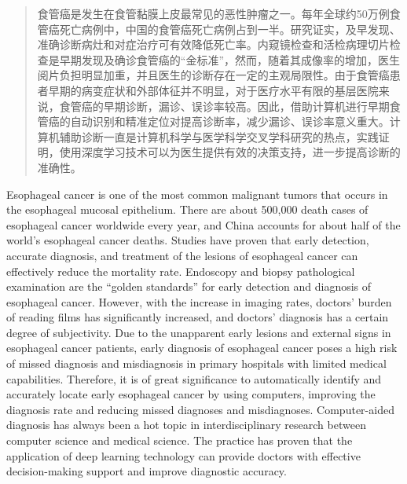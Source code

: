 
\setlength{\headheight}{13.70119pt}
\begin{abstract}
食管癌是发生在食管黏膜上皮最常见的恶性肿瘤之一。每年全球约50万例食管癌死亡病例中，中国的食管癌死亡病例占到一半。研究证实，及早发现、准确诊断病灶和对症治疗可有效降低死亡率。内窥镜检查和活检病理切片检查是早期发现及确诊食管癌的“金标准”，然而，随着其成像率的增加，医生阅片负担明显加重，并且医生的诊断存在一定的主观局限性。由于食管癌患者早期的病变症状和外部体征并不明显，对于医疗水平有限的基层医院来说，食管癌的早期诊断，漏诊、误诊率较高。因此，借助计算机进行早期食管癌的自动识别和精准定位对提高诊断率，减少漏诊、误诊率意义重大。计算机辅助诊断一直是计算机科学与医学科学交叉学科研究的热点，实践证明，使用深度学习技术可以为医生提供有效的决策支持，进一步提高诊断的准确性。


\end{abstract}

\begin{abstract*}
Esophageal cancer is one of the most common malignant tumors that occurs in the esophageal mucosal epithelium. There are about 500,000 death cases of esophageal cancer worldwide every year, and China accounts for about half of the world's esophageal cancer deaths. Studies have proven that early detection, accurate diagnosis, and treatment of the lesions of esophageal cancer can effectively reduce the mortality rate. Endoscopy and biopsy pathological examination are the “golden standards” for early detection and diagnosis of esophageal cancer. However, with the increase in imaging rates, doctors' burden of reading films has significantly increased, and doctors' diagnosis has a certain degree of subjectivity. Due to the unapparent early lesions and external signs in esophageal cancer patients, early diagnosis of esophageal cancer poses a high risk of missed diagnosis and misdiagnosis in primary hospitals with limited medical capabilities. Therefore, it is of great significance to automatically identify and accurately locate early esophageal cancer by using computers, improving the diagnosis rate and reducing missed diagnoses and misdiagnoses. Computer-aided diagnosis has always been a hot topic in interdisciplinary research between computer science and medical science. The practice has proven that the application of deep learning technology can provide doctors with effective decision-making support and improve diagnostic accuracy.


\end{abstract*}
